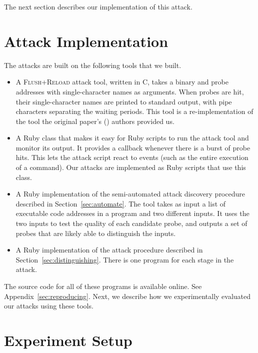 \documentclass[letterpaper,twocolumn,10pt]{article}
\begin{document}
The next section describes our implementation of this attack.

\section{Attack Implementation}
\label{sec:implementation}

The attacks are built on the following tools that we built.

\begin{itemize}
    \item A \textsc{Flush+Reload} attack tool, written in C, takes a binary and probe
        addresses with single-character names as arguments. When probes are hit,
        their single-character names are printed to standard output, with pipe
        characters separating the waiting periods. This tool is
        a re-implementation of the tool the original paper's
        (\cite{yarom2013flush}) authors provided us.

    \item A Ruby class that makes it easy for Ruby scripts to run the attack
        tool and monitor its output. It provides a callback whenever there is
        a burst of probe hits. This lets the attack script react to events (such
        as the entire execution of a command). Our attacks are implemented as
        Ruby scripts that use this class.

    \item A Ruby implementation of the semi-automated attack discovery procedure
        described in Section~\ref{sec:automate}. The tool takes as input a list
        of executable code addresses in a program and two different inputs. It
        uses the two inputs to test the quality of each candidate probe, and
        outputs a set of probes that are likely able to distinguish the inputs.

    \item A Ruby implementation of the attack procedure described in
          Section~\ref{sec:distinguishing}. There is one program for each stage
          in the attack.
\end{itemize}

The source code for all of these programs is available online. See
Appendix~\ref{sec:reproducing}. Next, we describe how we experimentally
evaluated our attacks using these tools.

\section{Experiment Setup}
\label{sec:experimentsetup}
\end{document}
